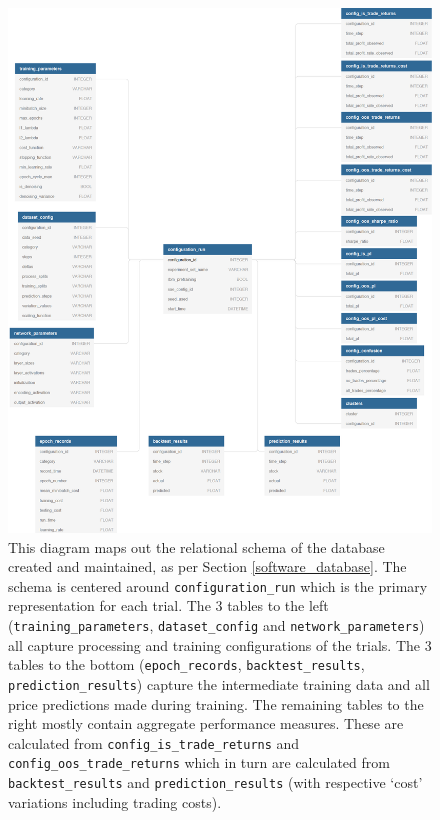 \documentclass[a4paper,11pt,oneside]{article}
\theoremstyle{plain}
\theoremstyle{definition}
\begin{document}
	\begin{figure}[H]
		\centering 
		\includegraphics[scale=0.55]{images/results/8_appendix/relational_schema.png}
		\caption[Relational Database Schema Diagram]{This diagram maps out the relational schema of the database created and maintained, as per Section \ref{software_database}. The schema is centered around \texttt{configuration\_run} which is the primary representation for each trial. The 3 tables to the left (\texttt{training\_parameters}, \texttt{dataset\_config} and \texttt{network\_parameters}) all capture processing and training configurations of the trials. The 3 tables to the bottom (\texttt{epoch\_records}, \texttt{backtest\_results}, \texttt{prediction\_results}) capture the intermediate training data and all price predictions made during training. The remaining tables to the right mostly contain aggregate performance measures. These are calculated from \texttt{config\_is\_trade\_returns} and \texttt{config\_oos\_trade\_returns} which in turn are calculated from \texttt{backtest\_results} and \texttt{prediction\_results} (with respective `cost' variations including trading costs). }
		\label{figure-database_schema}
	\end{figure}
	
\end{document}
